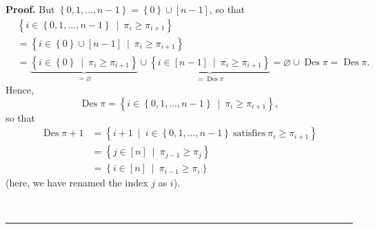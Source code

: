 \documentclass[numbers=enddot,12pt,final,onecolumn,notitlepage]{scrartcl}%
\theoremstyle{definition}
\newenvironment{proof}[1][Proof]{\noindent\textbf{#1.} }{\ \rule{0.5em}{0.5em}}
\newenvironment{verlong}{}{}
\begin{document}
\begin{verlong}
\begin{proof}
But $\left\{  0,1,\ldots,n-1\right\}  =\left\{  0\right\}  \cup\left[
n-1\right]  $, so that
\begin{align*}
&  \left\{  i\in\left\{  0,1,\ldots,n-1\right\}  \ \mid\ \pi_{i}\geq\pi
_{i+1}\right\} \\
&  =\left\{  i\in\left\{  0\right\}  \cup\left[  n-1\right]  \ \mid\ \pi
_{i}\geq\pi_{i+1}\right\} \\
&  =\underbrace{\left\{  i\in\left\{  0\right\}  \ \mid\ \pi_{i}\geq\pi
_{i+1}\right\}  }_{=\varnothing}\cup\underbrace{\left\{  i\in\left[
n-1\right]  \ \mid\ \pi_{i}\geq\pi_{i+1}\right\}  }_{=\operatorname*{Des}\pi
}=\varnothing\cup\operatorname*{Des}\pi=\operatorname*{Des}\pi.
\end{align*}
Hence,%
\[
\operatorname*{Des}\pi=\left\{  i\in\left\{  0,1,\ldots,n-1\right\}
\ \mid\ \pi_{i}\geq\pi_{i+1}\right\}  ,
\]
so that%
\begin{align}
\operatorname*{Des}\pi+1  &  =\left\{  i+1\ \mid\ i\in\left\{  0,1,\ldots
,n-1\right\}  \ \text{satisfies}\ \pi_{i}\geq\pi_{i+1}\right\} \nonumber\\
&  =\left\{  j\in\left[  n\right]  \ \mid\ \pi_{j-1}\geq\pi_{j}\right\}
\nonumber\\
&  =\left\{  i\in\left[  n\right]  \ \mid\ \pi_{i-1}\geq\pi_{i}\right\}
\label{pf.prop.Epk.through-Des.Des+1}%
\end{align}
(here, we have renamed the index $j$ as $i$).


\end{proof}
\end{verlong}
\end{document}
